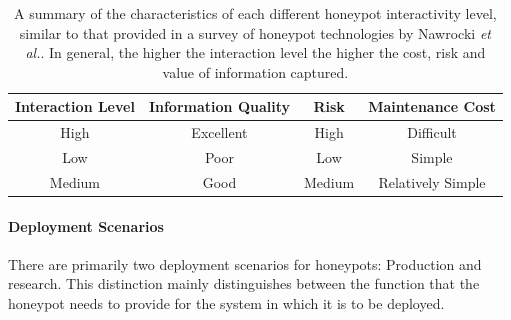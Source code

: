 \begin{table}[!h]
	\begin{center}
		\begin{tabular}{|c|c|c|c|} 
			\hline
			\bf Interaction Level  & \bf Information Quality  & \bf Risk  & \bf Maintenance Cost \\
			\hline
			High & Excellent & High & Difficult  \\
			Low & Poor & Low & Simple \\
			Medium & Good & Medium & Relatively Simple \\
			\hline
		\end{tabular}
	\end{center}
	\caption[Comparison of Interaction Levels of Honeypots.]{A summary of the characteristics of each different honeypot interactivity level, similar to that provided in a survey of honeypot technologies by Nawrocki \textit{et al.}. \cite{Nawrocki2016} In general, the higher the interaction level the higher the cost, risk and value of information captured.}	
	\label{table:honeypot-interaction}
\end{table}

\paragraph{Deployment Scenarios}

There are primarily two deployment scenarios for honeypots: Production and research. This distinction mainly distinguishes between the function that the honeypot needs to provide for the system in which it is to be deployed.

